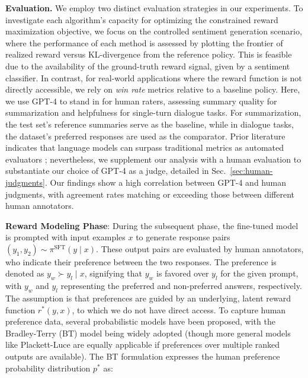 \textbf{Evaluation.} We employ two distinct evaluation strategies in our experiments. To investigate each algorithm’s capacity for optimizing the constrained reward maximization objective, we focus on the controlled sentiment generation scenario, where the performance of each method is assessed by plotting the frontier of realized reward versus KL-divergence from the reference policy. This is feasible due to the availability of the ground-truth reward signal, given by a sentiment classifier. In contrast, for real-world applications where the reward function is not directly accessible, we rely on \textit{win rate} metrics relative to a baseline policy. Here, we use GPT-4 to stand in for human raters, assessing summary quality for summarization and helpfulness for single-turn dialogue tasks. For summarization, the test set’s reference summaries serve as the baseline, while in dialogue tasks, the dataset’s preferred responses are used as the comparator. Prior literature indicates that language models can surpass traditional metrics as automated evaluators \citep{Chen2023ExploringTU}; nevertheless, we supplement our analysis with a human evaluation to substantiate our choice of GPT-4 as a judge, detailed in Sec.~\ref{sec:human-judgments}. Our findings show a high correlation between GPT-4 and human judgments, with agreement rates matching or exceeding those between different human annotators.

\textbf{Reward Modeling Phase}: During the subsequent phase, the fine-tuned model is prompted with input examples $x$ to generate response pairs $(y_1, y_2)\sim \pi^\text{SFT}(y \mid x)$. These output pairs are evaluated by human annotators, who indicate their preference between the two responses. The preference is denoted as $y_w\succ y_l \mid x$, signifying that $y_w$ is favored over $y_l$ for the given prompt, with $y_w$ and $y_l$ representing the preferred and non-preferred answers, respectively. The assumption is that preferences are guided by an underlying, latent reward function $r^*(y, x)$, to which we do not have direct access. To capture human preference data, several probabilistic models have been proposed, with the Bradley-Terry (BT) model \cite{bradley1952rankanalysis} being widely adopted (though more general models like Plackett-Luce \citep{plackett1975analysis, luce2012individual} are equally applicable if preferences over multiple ranked outputs are available). The BT formulation expresses the human preference probability distribution $p^*$ as:

